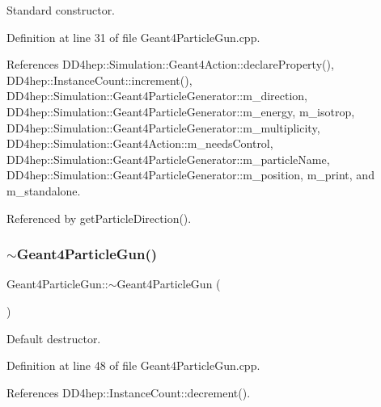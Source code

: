 Standard constructor. 



Definition at line 31 of file Geant4\+Particle\+Gun.\+cpp.



References D\+D4hep\+::\+Simulation\+::\+Geant4\+Action\+::declare\+Property(), D\+D4hep\+::\+Instance\+Count\+::increment(), D\+D4hep\+::\+Simulation\+::\+Geant4\+Particle\+Generator\+::m\+\_\+direction, D\+D4hep\+::\+Simulation\+::\+Geant4\+Particle\+Generator\+::m\+\_\+energy, m\+\_\+isotrop, D\+D4hep\+::\+Simulation\+::\+Geant4\+Particle\+Generator\+::m\+\_\+multiplicity, D\+D4hep\+::\+Simulation\+::\+Geant4\+Action\+::m\+\_\+needs\+Control, D\+D4hep\+::\+Simulation\+::\+Geant4\+Particle\+Generator\+::m\+\_\+particle\+Name, D\+D4hep\+::\+Simulation\+::\+Geant4\+Particle\+Generator\+::m\+\_\+position, m\+\_\+print, and m\+\_\+standalone.



Referenced by get\+Particle\+Direction().

\hypertarget{class_d_d4hep_1_1_simulation_1_1_geant4_particle_gun_a96f52fd8078d74c591d410facb13fe21}{}\label{class_d_d4hep_1_1_simulation_1_1_geant4_particle_gun_a96f52fd8078d74c591d410facb13fe21} 
\subsubsection{\texorpdfstring{$\sim$\+Geant4\+Particle\+Gun()}{~Geant4ParticleGun()}}
{\footnotesize\ttfamily Geant4\+Particle\+Gun\+::$\sim$\+Geant4\+Particle\+Gun (\begin{DoxyParamCaption}{ }\end{DoxyParamCaption})\hspace{0.3cm}{\ttfamily [virtual]}}



Default destructor. 



Definition at line 48 of file Geant4\+Particle\+Gun.\+cpp.



References D\+D4hep\+::\+Instance\+Count\+::decrement().



